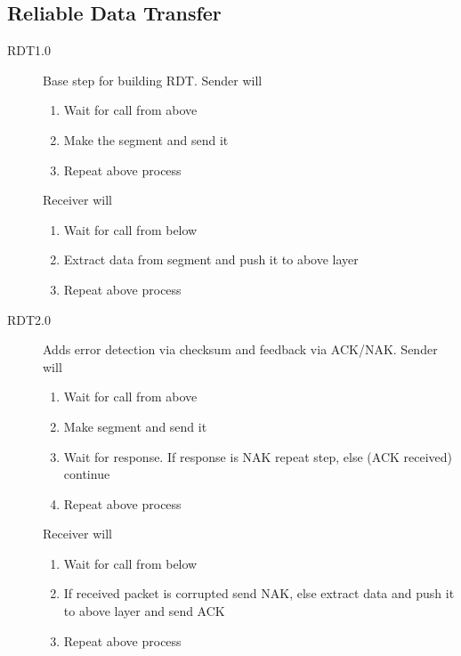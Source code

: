 \documentclass{article}
\begin{document}
\subsection*{Reliable Data Transfer}

\begin{description}
    \item[RDT1.0] Base step for building RDT. Sender will
    \begin{enumerate}
        \item Wait for call from above
        \item Make the segment and send it
        \item Repeat above process
    \end{enumerate}
    Receiver will
    \begin{enumerate}
        \item Wait for call from below
        \item Extract data from segment and push it to above layer
        \item Repeat above process
    \end{enumerate}
    
    \item[RDT2.0] Adds error detection via checksum and feedback via ACK/NAK. Sender will
    \begin{enumerate}
        \item Wait for call from above
        \item Make segment and send it
        \item Wait for response. If response is NAK repeat step, else (ACK received) continue
        \item Repeat above process
    \end{enumerate}
    Receiver will
    \begin{enumerate}
        \item Wait for call from below
        \item If received packet is corrupted send NAK, else extract data and push it to above layer 
        and send ACK
        \item Repeat above process
    \end{enumerate}
    

\end{description}
\end{document}
